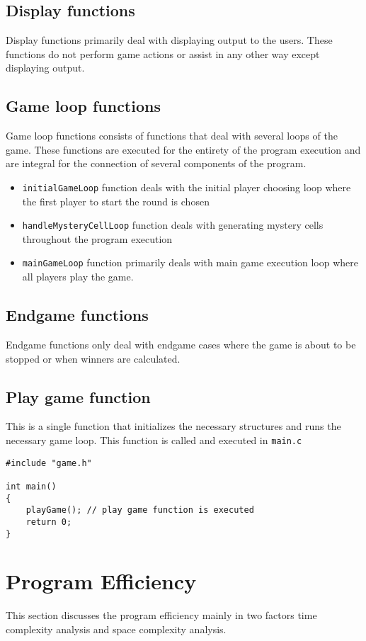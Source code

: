 \documentclass[12pt, a4paper]{report}
\begin{document}
\section{Display functions}
Display functions primarily deal with displaying output to the users. These functions do not perform game actions or assist in any other way except displaying output.

\section{Game loop functions}
Game loop functions consists of functions that deal with several loops of the game. These functions are executed for the entirety of the program execution and are integral for the connection of several components of the program.

\begin{itemize}
	\item \lstinline|initialGameLoop| function deals with the initial player choosing loop where the first player to start the round is chosen
	\item \lstinline|handleMysteryCellLoop| function deals with generating mystery cells throughout the program execution
	\item \lstinline|mainGameLoop| function primarily deals with main game execution loop where all players play the game.
\end{itemize}

\section{Endgame functions}
Endgame functions only deal with endgame cases where the game is about to be stopped or when winners are calculated. 

\section{Play game function}
This is a single function that initializes the necessary structures and runs the necessary game loop. This function is called and executed in \lstinline|main.c|

\begin{lstlisting}
#include "game.h"

int main()
{
    playGame(); // play game function is executed
    return 0;
}

\end{lstlisting}

\chapter{Program Efficiency}
This section discusses the program efficiency mainly in two factors time complexity analysis and space complexity analysis.
\end{document}
